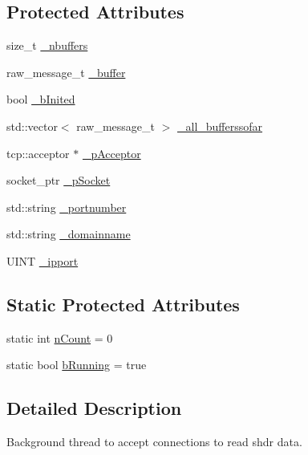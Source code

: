 \subsection*{Protected Attributes}
\begin{DoxyCompactItemize}
\item 
size\+\_\+t \hyperlink{class_socket_back_end_af669743bdc45984e4eae5d96ba4789fc}{\+\_\+nbuffers}
\item 
raw\+\_\+message\+\_\+t \hyperlink{class_socket_back_end_adb8b76cd34f2670231b0114f7692069e}{\+\_\+buffer}
\item 
bool \hyperlink{class_socket_back_end_a4b7b3da1325fa2eba9448d4589dcb0b2}{\+\_\+b\+Inited}
\item 
std\+::vector$<$ raw\+\_\+message\+\_\+t $>$ \hyperlink{class_socket_back_end_a9184c33f2e64fae646fed3a115a65943}{\+\_\+all\+\_\+bufferssofar}
\item 
tcp\+::acceptor $\ast$ \hyperlink{class_socket_back_end_a7c776294a4bb5a58510e64e7d53cc014}{\+\_\+p\+Acceptor}
\item 
socket\+\_\+ptr \hyperlink{class_socket_back_end_ad1378d92058b61576590bf220b8ee43e}{\+\_\+p\+Socket}
\item 
std\+::string \hyperlink{class_socket_back_end_a94686a8ef210b5e12c1233d297094e5b}{\+\_\+portnumber}
\item 
std\+::string \hyperlink{class_socket_back_end_ac4e76a3a0a99347d8f10a1e40ca615a0}{\+\_\+domainname}
\item 
U\+I\+N\+T \hyperlink{class_socket_back_end_ad2c45ca1c46d2fb1cb9166d3c4d44f56}{\+\_\+ipport}
\end{DoxyCompactItemize}
\subsection*{Static Protected Attributes}
\begin{DoxyCompactItemize}
\item 
static int \hyperlink{class_socket_back_end_a4c78e1cdf4cf31d732861f26744618c7}{n\+Count} = 0
\item 
static bool \hyperlink{class_socket_back_end_ae3ab62a2f4fe7fed700b875f9f7ff30c}{b\+Running} = true
\end{DoxyCompactItemize}


\subsection{Detailed Description}
Background thread to accept connections to read shdr data. 

